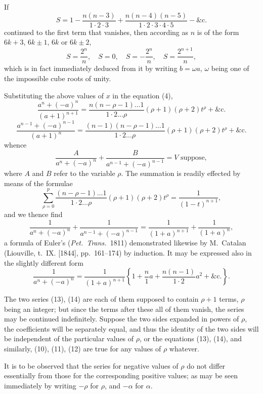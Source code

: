 \documentclass[11pt,a4paper]{book}
\begin{document}
If
\[
S = 1 - \frac{n(n - 3)}{1 \cdot 2\cdot 3} + \frac{n(n - 4)(n - 5)}{1 \cdot 2 \cdot 3 \cdot 4 \cdot 5} - \&\text{c.} \tag{8}
\]
continued to the first term that vanishes, then according as $n$ is of the form $6k + 3$, $6k \pm 1$, $6k$ or $6k \pm 2$,
\[
S = \frac{2^n}{n}, \quad S = 0, \quad S = -\frac{2^n}{n}, \quad S = \frac{2^{n+1}}{n}, \tag{9}
\]
which is in fact immediately deduced from it by writing $b = \omega a$, $\omega$ being one of the impossible cube roots of unity.

Substituting the above values of $x$ in the equation (4),
\[
\frac{a^n + (-a)^n}{(a + 1)^{n+1}} = \frac{n(n - \rho - 1)\ldots 1}{1 \cdot 2 \ldots \rho}(\rho + 1)(\rho + 2)t^\rho + \&\text{c.} \tag{10}
\]
\[
\frac{a^{n-1} + (-a)^{n-1}}{(a + 1)^n} = \frac{(n - 1)(n - \rho - 1)\ldots 1}{1 \cdot 2 \ldots \rho}(\rho + 1)(\rho + 2)t^\rho + \&\text{c.} \tag{11}
\]
whence
\[
\frac{A}{a^n + (-a)^n} + \frac{B}{a^{n-1} + (-a)^{n-1}} = V \text{ suppose}, \tag{12}
\]
where $A$ and $B$ refer to the variable $\rho$. The summation is readily effected by means of the formulae
\[
\sum_{\rho = 0}^{p} \frac{(n - \rho - 1)\ldots 1}{1 \cdot 2 \ldots \rho}(\rho + 1)(\rho + 2)t^\rho = \frac{1}{(1 - t)^{n+1}},
\]
and we thence find
\[
\frac{1}{a^n + (-a)^n} + \frac{1}{a^{n-1} + (-a)^{n-1}} = \frac{1}{(1 + a)^{n+1}} + \frac{1}{(1 + a)^n}, \tag{13}
\]
a formula of Euler's (\textit{Pet.\ Trans.}\ 1811) demonstrated likewise by M.\ Catalan (Liouville, t.~IX. [1844], pp.~161--174) by induction. It may be expressed also in the slightly different form
\[
\frac{1}{a^n + (-a)^n} = \frac{1}{(1 + a)^{n+1}}\left\{1 + \frac{n}{1}a + \frac{n(n - 1)}{1 \cdot 2}a^2 + \&\text{c.}\right\}. \tag{14}
\]

The two series (13), (14) are each of them supposed to contain $\rho + 1$ terms, $\rho$ being an integer; but since the terms after these all of them vanish, the series may be continued indefinitely. Suppose the two sides expanded in powers of $\rho$, the coefficients will be separately equal, and thus the identity of the two sides will be independent of the particular values of $\rho$, or the equations (13), (14), and similarly, (10), (11), (12) are true for any values of $\rho$ whatever.

It is to be observed that the series for negative values of $\rho$ do not differ essentially from those for the corresponding positive values; as may be seen immediately by writing $-\rho$ for $\rho$, and $-\alpha$ for $\alpha$.

\newpage
[187]
\end{document}
